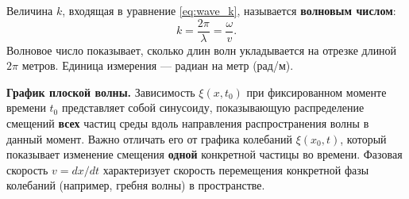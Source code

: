 \begin{definition}
Величина $k$, входящая в уравнение \eqref{eq:wave_k}, называется \textbf{волновым числом}:
\begin{equation}
    k = \frac{2\pi}{\lambda} = \frac{\omega}{v}.
\end{equation}
Волновое число показывает, сколько длин волн укладывается на отрезке длиной $2\pi$ метров. Единица измерения --- радиан на метр (рад/м).
\end{definition}

\begin{remark}
\textbf{График плоской волны.} Зависимость $\xi(x, t_0)$ при фиксированном моменте времени $t_0$ представляет собой синусоиду, показывающую распределение смещений \textbf{всех} частиц среды вдоль направления распространения волны в данный момент. Важно отличать его от графика колебаний $\xi(x_0, t)$, который показывает изменение смещения \textbf{одной} конкретной частицы во времени. Фазовая скорость $v = dx/dt$ характеризует скорость перемещения конкретной фазы колебаний (например, гребня волны) в пространстве.
\end{remark}


